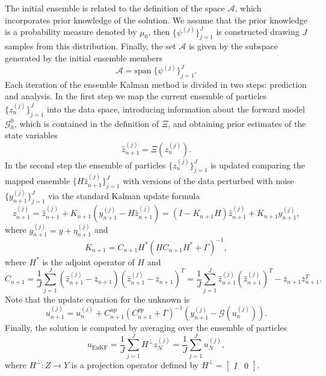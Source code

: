 \documentclass[10pt]{article}
\begin{document}
The initial ensemble is related to the definition of the space $\mathcal{A}$, which incorporates prior knowledge of the solution. We assume that the prior knowledge is a probability measure denoted by $\mu_0$, then $\{ \psi^{(j)} \}_{j = 1}^J$ is constructed drawing $J$ samples from this distribution. Finally, the set $\mathcal{A}$ is given by the subspace generated by the initial ensemble members
\[ \mathcal{A} = \mathrm{span} \; \{\psi^{(j)} \}_{j=1}^J. \]
Each iteration of the ensemble Kalman method is divided in two steps: prediction and analysis. In the first step we map the current ensemble of particles $\{ z_n^{(j)} \}_{j=1}^J$ into the data space, introducing information about the forward model $\mathcal{G}^0_h$, which is contained in the definition of $\Xi$, and obtaining prior estimates of the state variables
\begin{equation*}
\hat{z}_{n+1}^{(j)} = \Xi(z_n^{(j)}).
\end{equation*}
In the second step the ensemble of particles $\{ z_n^{(j)} \}_{j=1}^J$ is updated comparing the mapped ensemble $\{ H \hat{z}_{n+1}^{(j)} \}_{j=1}^J$ with versions of the data perturbed with noise $\{ y_{n+1}^{(j)} \}_{j=1}^J$ via the standard Kalman update formula
\begin{equation}
z_{n+1}^{(j)} = \hat{z}_{n+1}^{(j)} + K_{n+1} (y_{n+1}^{(j)} - H \hat{z}_{n+1}^{(j)}) = (I - K_{n+1} H) \hat{z}_{n+1}^{(j)} + K_{n+1} y_{n+1}^{(j)},
\end{equation}
where $y_{n+1}^{(j)} = y + \eta_{n+1}^{(j)}$ and
\begin{equation*}
K_{n+1} = C_{n+1} H^* (H C_{n+1} H^* + \Gamma)^{-1},
\end{equation*}
where $H^*$ is the adjoint operator of $H$ and
\begin{equation*}
C_{n+1} = \frac{1}{J} \sum_{j = 1}^J (\hat{z}_{n+1}^{(j)} - \bar{z}_{n+1}) (\hat{z}_{n+1}^{(j)} - \bar{z}_{n+1})^T = \frac{1}{J} \sum_{j = 1}^J \hat{z}_{n+1}^{(j)} (\hat{z}_{n+1}^{(j)})^T - \bar{z}_{n+1} \bar{z}_{n+1}^T.
\end{equation*}
Note that the update equation for the unknown is
\begin{equation*}
u_{n+1}^{(j)} = u_n^{(j)} + C_{n+1}^{up} ( C_{n+1}^{pp} + \Gamma )^{-1} (y_{n+1}^{(j)} - \mathcal{G}(u_n^{(j)})). 
\end{equation*}
Finally, the solution is computed by averaging over the ensemble of particles
\begin{equation*}
u_{\mathrm{EnKF}} = \frac{1}{J} \sum_{j = 1}^J H^{\perp} z_{N}^{(j)} = \frac{1}{J} \sum_{j = 1}^J u_{N}^{(j)},
\end{equation*}
where $H^{\perp} \colon Z \to Y$ is a projection operator defined by $H^{\perp} = \begin{bmatrix} I & 0 \end{bmatrix}$.
\end{document}
